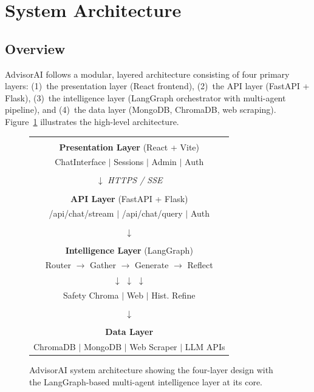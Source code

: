 \documentclass[conference,compsoc]{IEEEtran}
\begin{document}
\section{System Architecture}
\label{sec:architecture}

\subsection{Overview}

AdvisorAI follows a modular, layered architecture consisting of four primary layers: (1)~the presentation layer (React frontend), (2)~the API layer (FastAPI + Flask), (3)~the intelligence layer (LangGraph orchestrator with multi-agent pipeline), and (4)~the data layer (MongoDB, ChromaDB, web scraping). Figure~\ref{fig:architecture} illustrates the high-level architecture.

\begin{figure}[htbp]
\centering
\footnotesize
\begin{tabular}{|c|}
\hline
\\[-4pt]
\textbf{Presentation Layer} (React + Vite) \\
ChatInterface $\mid$ Sessions $\mid$ Admin $\mid$ Auth \\[2pt]
\hline
\\[-4pt]
$\downarrow$ \textit{HTTPS / SSE} \\[2pt]
\hline
\\[-4pt]
\textbf{API Layer} (FastAPI + Flask) \\
/api/chat/stream $\mid$ /api/chat/query $\mid$ Auth \\[2pt]
\hline
\\[-4pt]
$\downarrow$ \\[2pt]
\hline
\\[-4pt]
\textbf{Intelligence Layer} (LangGraph) \\[2pt]
Router $\to$ Gather $\to$ Generate $\to$ Reflect \\[2pt]
$\downarrow$ \hspace{24pt} $\downarrow$ \hspace{40pt} $\downarrow$ \\
Safety \hspace{4pt} Chroma $\mid$ Web $\mid$ Hist. \hspace{4pt} Refine \\[2pt]
\hline
\\[-4pt]
$\downarrow$ \\[2pt]
\hline
\\[-4pt]
\textbf{Data Layer} \\
ChromaDB $\mid$ MongoDB $\mid$ Web Scraper $\mid$ LLM APIs \\[2pt]
\hline
\end{tabular}
\caption{AdvisorAI system architecture showing the four-layer design with the LangGraph-based multi-agent intelligence layer at its core.}
\label{fig:architecture}
\end{figure}
\end{document}
